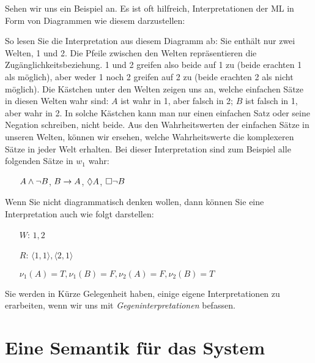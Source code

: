 Sehen wir uns ein Beispiel an. Es ist oft hilfreich, Interpretationen der ML in Form von Diagrammen wie diesem darzustellen:
\begin{center}
\end{center}
So lesen Sie die Interpretation aus diesem Diagramm ab: Sie enthält nur zwei Welten, 1 und 2. Die Pfeile zwischen den Welten repräsentieren die Zugänglichkeitsbeziehung. 1 und 2 greifen also beide auf 1 zu (beide erachten 1 als möglich), aber weder 1 noch 2 greifen auf 2 zu (beide erachten 2 als nicht möglich). Die Kästchen unter den Welten zeigen uns an, welche einfachen Sätze in diesen Welten wahr sind: $A$ ist wahr in 1, aber falsch in 2; $B$ ist falsch in 1, aber wahr in 2. In solche Kästchen kann man nur einen einfachen Satz oder seine Negation schreiben, nicht beide. Aus den Wahrheitswerten der einfachen Sätze in unseren Welten, können wir ersehen, welche Wahrheitswerte die komplexeren Sätze in jeder Welt erhalten. Bei dieser Interpretation sind zum Beispiel alle folgenden Sätze in $w_1$ wahr:
\begin{itemize}
	\item[]$A\wedge\neg B$, $B\rightarrow A$, $\Diamond A$, $\Box\neg B$
\end{itemize}
Wenn Sie nicht diagrammatisch denken wollen, dann können Sie eine Interpretation auch wie folgt darstellen:
\begin{itemize}
	\item[$W$:]$1,2$
	\item[$R$:]$\langle 1,1\rangle, \langle 2,1\rangle$
	\item[]$\nu_{1}(A)=T, \nu_{1}(B)=F, \nu_{2}(A)=F, \nu_{2}(B)=T$
\end{itemize}
Sie werden in Kürze Gelegenheit haben, einige eigene Interpretationen zu erarbeiten, wenn wir uns mit \emph{Gegeninterpretationen} befassen.

\section{Eine Semantik für das System \mlK}
\label{SemanticsK}


